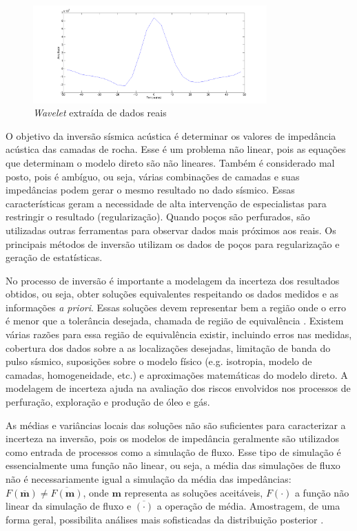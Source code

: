 \begin{figure}[htp]
\begin{center}
  \includegraphics[width=0.8\textwidth]{fig/wavelet}
  \caption{\textit{Wavelet} extraída de dados reais}
  \label{fig:wavelet}
\end{center}
\end{figure}

O objetivo da inversão sísmica acústica é determinar os valores de impedância
acústica das camadas de rocha. Esse é um problema não linear, pois as equações
que determinam o modelo direto são não lineares. Também é considerado mal posto,
pois é ambíguo, ou seja, várias combinações de camadas e suas impedâncias podem
gerar o mesmo resultado no dado sísmico. Essas características geram a
necessidade de alta intervenção de especialistas para restringir o resultado
(regularização). Quando poços são perfurados, são utilizadas outras ferramentas
para observar dados mais próximos aos reais. Os principais métodos de inversão
utilizam os dados de poços para regularização e geração de estatísticas.

No processo de inversão é importante a modelagem da incerteza dos resultados
obtidos, ou seja, obter soluções equivalentes respeitando os dados medidos e as
informações \textit{a priori}. Essas soluções devem representar bem a região
onde o erro é menor que a tolerância desejada, chamada de região de equivalência
\citep{tompkins_comparisonBayes}. Existem várias razões para essa região de
equivalência existir, incluindo erros nas medidas, cobertura dos dados sobre a
as localizações desejadas, limitação de banda do pulso sísmico, suposições sobre
o modelo físico (e.g. isotropia, modelo de camadas, homogeneidade, etc.) e
aproximações matemáticas do modelo direto. A modelagem de incerteza ajuda na
avaliação dos riscos envolvidos nos processos de perfuração, exploração e
produção de óleo e gás.

As médias e variâncias locais das soluções não são suficientes para caracterizar
a incerteza na inversão, pois os modelos de impedância geralmente são utilizados
como entrada de processos como a simulação de fluxo. Esse tipo de simulação é
essencialmente uma função não linear, ou seja, a média das simulações de fluxo
não é necessariamente igual a simulação da média das impedâncias:
$F(\overline{\mathbf{m}})\neq \overline{F(\mathbf{m})}$, onde ${\mathbf{m}}$
representa as soluções aceitáveis, $F(\cdot)$ a função não linear da
simulação de fluxo e $ \overline{(\cdot)}$ a operação de média. Amostragem, de
uma forma geral, possibilita análises mais sofisticadas da distribuição
posterior \citep{hansenGibbsPrior}.

